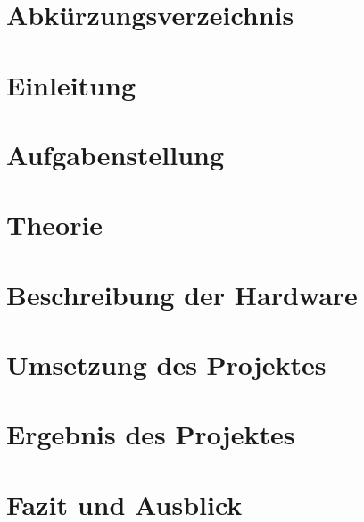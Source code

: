 \documentclass[ngerman]{scrartcl} %
\begin{document}
\thispagestyle{empty}
   


\newpage

{}
\tableofcontents
\newpage

{}
\listoffigures
\newpage

{}
\listoftables 
\newpage

\section*{Abkürzungsverzeichnis}
\label{sec:Abkürzungsverzeichnis}


\section{Einleitung}        
\label{sec:Einleitung-1}   
    

\section{Aufgabenstellung}
\label{sec:Aufgabenstellung-1}


\section{Theorie}        
\label{sec:Theorie-1}  

 
\section{Beschreibung der Hardware}        
\label{sec:Beschreibung der Hardware-1}  


\section{Umsetzung des Projektes}        
\label{sec:Umsetzung des Projektes-1}  


\section{Ergebnis des Projektes}        
\label{sec:Ergebnis des Projektes-1}  


\section{Fazit und Ausblick}        
\label{sec:Fazit und Ausblick-1}  


\newpage
{}
{}
  


\appendix    
\label{sec:Anhang-1}  

\end{document}
